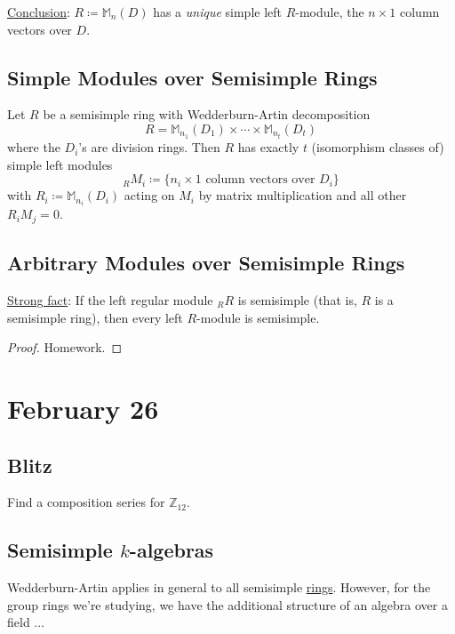 \documentclass[12pt]{article}
\newcommand{\z}{\mathbb{Z}}
\newcommand{\ita}[1]{\textit{#1}}
\theoremstyle{definition}
\newcommand{\m}{\mathbb{M}}
\begin{document}
\noindent
\underline{Conclusion}: $R \coloneqq  \m_n(D)$ has a \ita{unique} simple left $R$-module, the $n \times 1$ column vectors over $D$.
\subsection{Simple Modules over Semisimple Rings}
Let $R$ be a semisimple ring with Wedderburn-Artin decomposition
\begin{equation}
    R = \m_{n_1}(D_1) \times \dotsb \times \m_{n_t}(D_t)
\end{equation}
where the $D_i$'s are division rings. Then $R$ has exactly $t$ (isomorphism classes of) simple left modules
\begin{equation}
    _RM_i \coloneqq  \{ n_i \times 1 \text{ column vectors over } D_i \}
\end{equation}
with $R_i \coloneqq  \m_{n_i}(D_i)$ acting on $M_i$ by matrix multiplication and all other $R_iM_j = 0$.
\subsection{Arbitrary Modules over Semisimple Rings}
\underline{Strong fact}: If the left regular module $_RR$ is semisimple (that is, $R$ is a semisimple ring), then every left $R$-module is semisimple.
\begin{proof}
    Homework.
\end{proof}
\section{February 26}
\subsection{Blitz}
Find a composition series for $\z_{12}$.
\subsection{Semisimple \texorpdfstring{$k$}{k}-algebras}
Wedderburn-Artin applies in general to all semisimple \underline{rings}. However, for the group rings we're studying, we have the additional structure of an algebra over a field $\dotsc$
\end{document}
